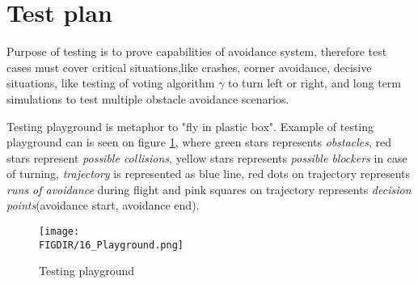 \begin{algorithm}[H]
\end{algorithm}


\section{Test plan}\label{s:testplan}
Purpose of testing is to prove capabilities of avoidance system, therefore test cases must cover critical situations,like crashes, corner avoidance, decisive situations, like testing of voting algorithm $\gamma$ to turn left or right, and long term simulations to test multiple obstacle avoidance scenarios.

Testing playground is metaphor to "fly in plastic box". Example of testing playground can is seen on figure \ref{fig:Playground}, where green stars represents \textit{obstacles}, red stars represent \textit{possible collisions}, yellow stars represents \textit{possible blockers} in case of turning, \textit{trajectory} is represented as blue line, red dots on trajectory represents \textit{runs of avoidance} during flight and pink squares on trajectory represents \textit{decision points}(avoidance start, avoidance end). 

\begin{figure}[H]
    \centering
    \texttt{[image: \\FIGDIR/16\_Playground.png]} 
    \caption{Testing playground}
    \label{fig:Playground}
\end{figure}

